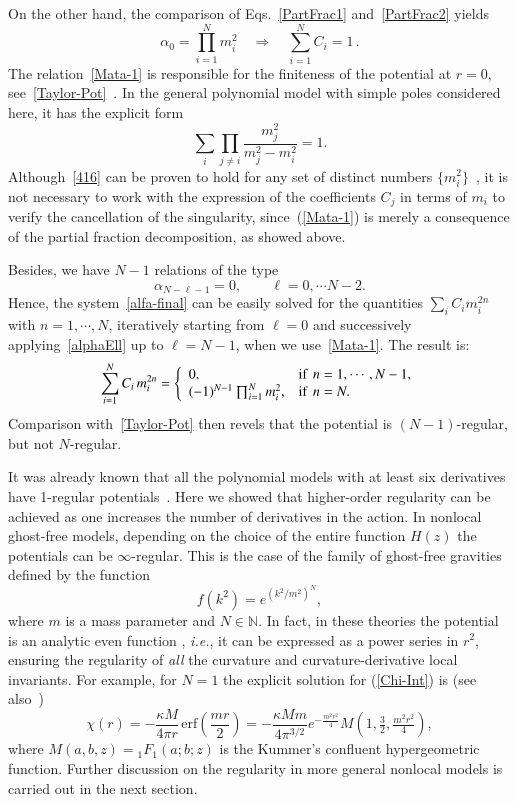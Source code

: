 \documentclass[aps,prd,a4paper,twocolumn,showpacs,showkeys,preprintnumbers,amsmath,amssymb,nofootinbib]{revtex4-2}
\numberwithin{equation}{section}
\def\beq{\begin{equation}}
\def\eeq{\end{equation}}
\newcommand{\eq}[1]{(\ref{#1})}
\newcommand{\n}[1]{\label{#1}}
\begin{document}
On the other hand, the comparison of Eqs.~\eqref{PartFrac1} and~\eqref{PartFrac2} yields
\beq \label{Mata-1}
\alpha_0 = \prod_{i=1}^N m_i^2 \quad  \Longrightarrow \quad \sum_{i=1}^N C_i = 1 \, .
\eeq
The relation~\eqref{Mata-1} is responsible for the finiteness of the potential at $r=0$, see~\eqref{Taylor-Pot}~\cite{Newton-MNS,Newton-BLG,BreTib1}. In the general polynomial model with simple poles considered here, it has the explicit form
\beq \label{416}
\sum_{i} \prod_{j \neq i}  \frac{m_j^2}{m_j^2 - m_i^2}  = 1.
\eeq
Although~\eqref{416}  can be proven to hold for any set of distinct numbers $\lbrace m_i^2 \rbrace$~\cite{Newton-BLG}, it is not necessary to work with the expression of the coefficients $C_j$ in terms of $m_i$ to verify the cancellation of the singularity, since~\eq{Mata-1} is merely a consequence of the partial fraction decomposition, as showed above.

Besides, we have $N-1$ relations of the type 
\beq \label{alphaEll}
\alpha_{N-\ell-1} = 0, \qquad \ell = 0,\cdots N-2.
\eeq
Hence, the system~\eqref{alfa-final} can be easily solved for the quantities $\sum_i C_i m_i^{2n}$ with $n=1,\cdots,N$, iteratively starting from $\ell=0$ and successively applying~\eqref{alphaEll} up to $\ell=N-1$, when we use~\eqref{Mata-1}. The result is: 
\beq \label{array1}
\sum_{i=1}^N C_i \, m_i^{2n}   =  \left\{ 
\begin{array}{l l}
0  ,  &  \text{if } \,  n =1,\cdots, N-1,\\
 (-1)^{N-1} \prod_{i=1}^N  m_i^2    , &  \text{if } \, n = N.
\end{array} \right .
\eeq
Comparison with~\eqref{Taylor-Pot} then revels that the potential is $(N-1)$-regular, but not $N$-regular.


It was already known that all the polynomial models with at least six derivatives have 1-regular potentials~\cite{BreTib1}. Here we showed that higher-order regularity can be achieved as one increases the number of derivatives in the action.
In nonlocal ghost-free models, depending on the choice of the entire function $H(z)$ the potentials can be $\infty$-regular. This is the case of the family of ghost-free gravities defined by the function
\beq
\n{GFNff}
f(k^2)=e^{(k^2/m^2)^N},
\eeq 
where $m$ is a mass parameter and $N\in \mathbb{N}$. In fact, in these theories the potential is an analytic even function \cite{Head-On,Edholm:2016hbt}, \textit{i.e.}, it can be expressed as a power series in $r^2$, ensuring the regularity of \textit{all} the curvature and curvature-derivative local invariants. For example, for $N=1$ the explicit solution for \eq{Chi-Int} is \cite{Tseytlin:1995uq} (see also~\cite{Modesto12,SiegelEtAl})
\begin{equation}
\n{Tseytlin}
\chi (r)  = - \frac{\kappa M}{4 \pi r} \, \text{erf}\left(\frac{m r}{2}\right) = 
- \frac{\kappa M m}{4 \pi^{3/2} } e^{-\frac{m^2r^2}{4}} M \left( 1, \tfrac32, \tfrac{m^2 r^2}{4} \right) ,
\end{equation}
where $M(a,b,z) = {}_1 F_1(a;b;z)$ is the Kummer's confluent hypergeometric function. Further discussion on the regularity in more general nonlocal models is carried out in the next section.
\end{document}
